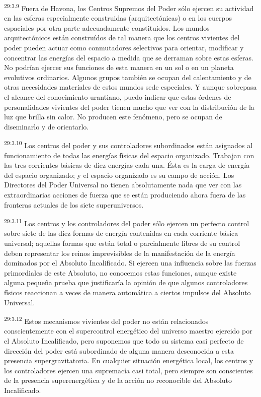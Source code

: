 \par
\textsuperscript{29:3.9} Fuera de Havona, los Centros Supremos del Poder sólo ejercen su actividad en las esferas especialmente construidas (arquitectónicas) o en los cuerpos espaciales por otra parte adecuadamente constituidos. Los mundos arquitectónicos están construídos de tal manera que los centros vivientes del poder pueden actuar como conmutadores selectivos para orientar, modificar y concentrar las energías del espacio a medida que se derraman sobre estas esferas. No podrían ejercer sus funciones de esta manera en un sol o en un planeta evolutivos ordinarios. Algunos grupos también se ocupan del calentamiento y de otras necesidades materiales de estos mundos sede especiales. Y aunque sobrepasa el alcance del conocimiento urantiano, puedo indicar que estas órdenes de personalidades vivientes del poder tienen mucho que ver con la distribución de la luz que brilla sin calor. No producen este fenómeno, pero se ocupan de diseminarlo y de orientarlo.

\par
\textsuperscript{29:3.10} Los centros del poder y sus controladores subordinados están asignados al funcionamiento de todas las energías físicas del espacio organizado. Trabajan con las tres corrientes básicas de diez energías cada una. Ésta es la carga de energía del espacio organizado; y el espacio organizado es su campo de acción. Los Directores del Poder Universal no tienen absolutamente nada que ver con las extraordinarias acciones de fuerza que se están produciendo ahora fuera de las fronteras actuales de los siete superuniversos.

\par
\textsuperscript{29:3.11} Los centros y los controladores del poder sólo ejercen un perfecto control sobre siete de las diez formas de energía contenidas en cada corriente básica universal; aquellas formas que están total o parcialmente libres de su control deben representar los reinos imprevisibles de la manifestación de la energía dominados por el Absoluto Incalificado. Si ejercen una influencia sobre las fuerzas primordiales de este Absoluto, no conocemos estas funciones, aunque existe alguna pequeña prueba que justificaría la opinión de que algunos controladores físicos reaccionan a veces de manera automática a ciertos impulsos del Absoluto Universal.

\par
\textsuperscript{29:3.12} Estos mecanismos vivientes del poder no están relacionados conscientemente con el supercontrol energético del universo maestro ejercido por el Absoluto Incalificado, pero suponemos que todo su sistema casi perfecto de dirección del poder está subordinado de alguna manera desconocida a esta presencia supergravitatoria. En cualquier situación energética local, los centros y los controladores ejercen una supremacía casi total, pero siempre son conscientes de la presencia superenergética y de la acción no reconocible del Absoluto Incalificado.

